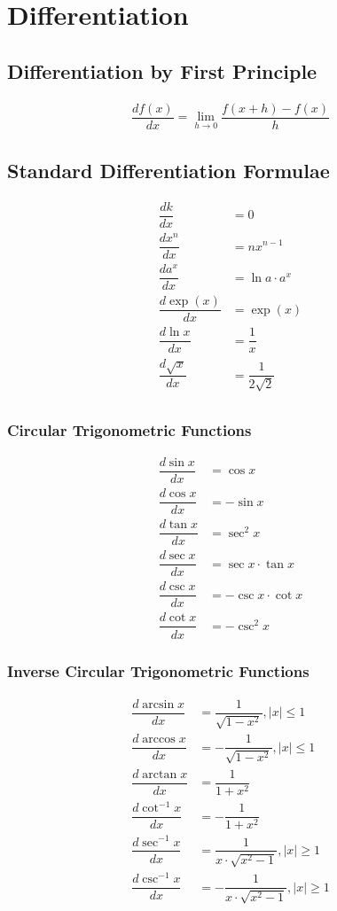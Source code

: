 \documentclass[../main.tex]{subfile}
\begin{document}
    \chapter{Differentiation}
    \section{Differentiation by First Principle}
    \begin{align}
        \dfrac{df(x)}{dx} = \lim_{h \to 0} \dfrac{f(x + h) - f(x)}{h}
    \end{align}

    \section{Standard Differentiation Formulae}
    \begin{align}
        \dfrac{dk}{dx} & = 0\\
        \dfrac{dx^n}{dx} & = nx^{n - 1}\\
        \dfrac{da^x}{dx} & = \ln a \cdot a^x\\
        \dfrac{d\exp(x)}{dx} & = \exp(x)\\
        \dfrac{d\ln x}{dx} & = \dfrac{1}{x}\\
        \dfrac{d\sqrt{x}}{dx} & = \dfrac{1}{2\sqrt{2}}\\
    \end{align}
    \subsection{Circular Trigonometric Functions}
    \begin{align}
        \dfrac{d\sin x}{dx} & = \cos x\\
        \dfrac{d\cos x}{dx} & = -\sin x\\
        \dfrac{d\tan x}{dx} & = \sec^2 x\\
        \dfrac{d\sec x}{dx} & = \sec x \cdot \tan x\\
        \dfrac{d\csc x}{dx} & = -\csc x \cdot \cot x\\
        \dfrac{d\cot x}{dx} & = -\csc^2 x
    \end{align}
    \subsection{Inverse Circular Trigonometric Functions}
    \begin{align}
        \dfrac{d\arcsin x}{dx} & = \dfrac{1}{\sqrt{1 - x^2}}, \lvert x \rvert \leq 1\\
        \dfrac{d\arccos x}{dx} & = -\dfrac{1}{\sqrt{1 - x^2}}, \lvert x \rvert \leq 1\\
        \dfrac{d\arctan x}{dx} & = \dfrac{1}{1 + x^2}\\
        \dfrac{d\cot^{-1} x}{dx} & = -\dfrac{1}{1 + x^2}\\
        \dfrac{d\sec^{-1} x}{dx} & = \dfrac{1}{x \cdot \sqrt{x^2 - 1}}, \lvert x \rvert \geq 1\\
        \dfrac{d\csc^{-1} x}{dx} & = -\dfrac{1}{x \cdot \sqrt{x^2 - 1}}, \lvert x \rvert \geq 1
    \end{align}
\end{document}
